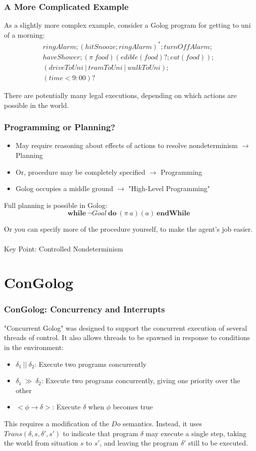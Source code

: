 \documentclass{beamer}
\begin{document}
\begin{frame}
\frametitle{A More Complicated Example}
As a slightly more complex example, consider a Golog program for
getting to uni of a morning:\[
\begin{array}{c}
ringAlarm;(hitSnooze; ringAlarm)^*;turnOffAlarm;\\
haveShower;(\pi\ food)(edible(food)?;eat(food));\\
(driveToUni\ |\ tramToUni\ |\ walkToUni);\\
(time<9:00)?
\end{array}\]

There are potentially many legal executions, depending on which actions
are possible in the world.
\end{frame}

\begin{frame}
\frametitle{Programming or Planning?}
\begin{itemize}
  \item May require reasoning about effects of actions to resolve nondeterminism
$\rightarrow$ Planning
  \item Or, procedure may be completely specified $\rightarrow$ Programming
  \item Golog occupies a middle ground $\rightarrow$ "High-Level Programming"
\end{itemize}

Full planning is possible in Golog:\[
\mathbf{while}\ \neg Goal\ \mathbf{do}\ (\pi\ a)(a)\ \mathbf{endWhile}\]

Or you can specify more of the procedure yourself, to make the agent's job
easier.\\
\ \\
Key Point: \alert{Controlled} Nondeterminism
\end{frame}

\section{ConGolog}
\begin{frame}
\frametitle{ConGolog: Concurrency and Interrupts}
"Concurrent Golog" was designed to support the concurrent execution of
several threads of control.  It also allows threads to be spawned in
response to conditions in the environment:
\begin{itemize}
  \pause
  \item $\delta_1\ ||\ \delta_2$: Execute two programs concurrently
  \pause
  \item $\delta_1\ \gg\ \delta_2$: Execute two programs concurrently, giving one priority over the other
  \pause
  \item $<\phi \rightarrow \delta>$: Execute $\delta$ when $\phi$ becomes true
\end{itemize}
\pause
This requires a modification of the $Do$ semantics.  Instead, it uses
$Trans(\delta,s,\delta',s')$ to indicate that program $\delta$ may execute
a single step, taking the world from situation $s$ to $s'$, and leaving the
program $\delta'$ still to be executed.
\end{frame}
\end{document}
